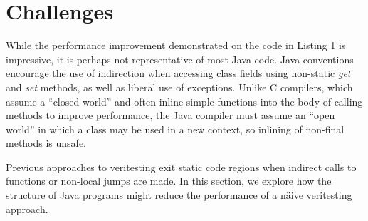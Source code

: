 \section{Challenges}

While the performance improvement demonstrated on the code in Listing 1 is impressive, it is perhaps not representative of most Java code.  Java conventions encourage the use of indirection when accessing class fields using non-static {\em get} and {\em set} methods, as well as liberal use of exceptions.  Unlike C compilers, which assume a ``closed world'' and often inline simple functions into the body of calling methods to improve performance, the Java compiler must assume an ``open world'' in which a class may be used in a new context, so inlining of non-final methods is unsafe.

Previous approaches to veritesting exit static code regions when indirect calls to functions or non-local jumps are made.  In this section, we explore how the structure of Java programs might reduce the performance of a n\"aive veritesting approach.

%
%
%
